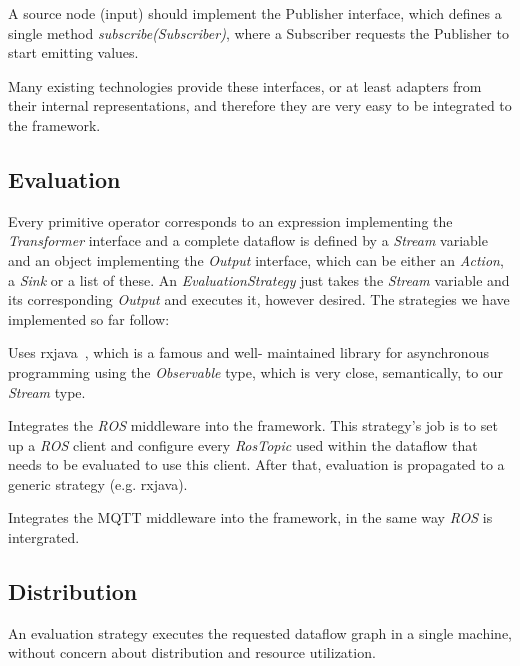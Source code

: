 \documentclass[sigplan,review,anonymous]{acmart}
\begin{document}
A source node (input) should implement the Publisher interface, which defines a
single method \textit{subscribe(Subscriber)}, where a Subscriber requests the
Publisher to start emitting values.

Many existing technologies provide these interfaces, or at least adapters from
their internal representations, and therefore they are very easy to be
integrated to the framework.

\subsection{Evaluation}

Every primitive operator corresponds to an expression implementing the
\textit{Transformer} interface and a complete dataflow is defined by a
\textit{Stream} variable and an object implementing the \textit{Output} interface,
which can be either an \textit{Action}, a \textit{Sink} or a list of these.
An \textit{EvaluationStrategy} just takes the \textit{Stream} variable and its
corresponding \textit{Output} and executes it, however desired.
The strategies we have implemented so far follow:
\begin{description}[style=nextline]
\item[RxJavaEvaluationStrategy] Uses
rxjava~\cite{rxjava}, which is a famous and well-
maintained library for asynchronous programming using the \textit{Observable}
type, which is very close, semantically, to our \textit{Stream} type.

\item[RosEvaluationStrategy] Integrates the \textit{ROS} middleware into the
framework. This strategy's job is to set up a \textit{ROS} client and configure every
\textit{RosTopic} used within the dataflow that needs to be evaluated to use
this client. After that, evaluation is propagated to a generic strategy (e.g.
rxjava).

\item[MqttEvaluationStrategy] Integrates the MQTT middleware into the framework,
in the same way \textit{ROS} is intergrated. \end{description}

\subsection{Distribution}

An evaluation strategy executes the requested dataflow graph in a single
machine, without concern about distribution and resource utilization.
\end{document}

